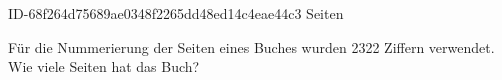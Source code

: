 \begin{exercise}
      {ID-68f264d75689ae0348f2265dd48ed14c4eae44c3}
      {Seiten}
  \ifproblem\problem\par
    Für die Nummerierung der Seiten eines Buches wurden 2322 Ziffern verwendet.
    Wie viele Seiten hat das Buch?
  \fi
\end{exercise}

